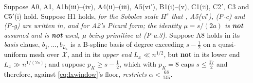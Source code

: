 \begin{proposition}\label{prp:phirate}
Suppose A0, A1, A1b(iii)--(iv), A4(ii)--(iii), A5(vi$'$), B1(i)--(v), C1(ii), C2$'$, C3 and C5$'$(i) hold.
Suppose H1 holds, \emph{for the Sobolev scale $H^{s}$ that , A5(vi$'$),
(P-c) and (P-g) are written in, and for A2's Picard form; the identity $\mu=s/(2a)$ is \textbf{not}
assumed and is \textbf{not} used, $\mu$ being primitive at (P-a.3)}. Suppose A8 holds in its
\emph{basis} clause, $b_1,\dots,b_{L_x}$ is a B-spline basis of degree exceeding $s-\tfrac12$ on a
quasi-uniform mesh over $\mathcal X$, and in its \emph{upper end} $L_x\ll n^{1/2}$, but \textbf{not} in
its lower end $L_x\gg n^{1/(2s)}$; and suppose $p_K\ge s-\tfrac12$, which with
$p_K=8$ caps $s\le\tfrac{17}2$ and therefore, against \eqref{eq:lxwindow}'s floor,
\emph{restricts $\alpha<\tfrac{68}{145}$}.

\end{proposition}
